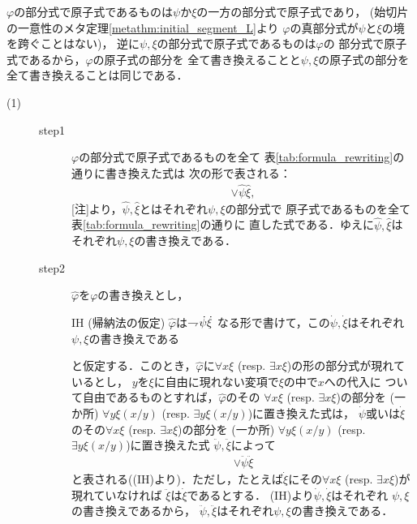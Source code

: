 	\begin{metaprf}
		[注] $\varphi$の部分式で原子式であるものは$\psi$か$\xi$の一方の部分式で原子式であり，
		(始切片の一意性のメタ定理\ref{metathm:initial_segment_L}より
		$\varphi$の真部分式が$\psi$と$\xi$の境を跨ぐことはない)，
		逆に$\psi,\xi$の部分式で原子式であるものは$\varphi$の
		部分式で原子式であるから，$\varphi$の原子式の部分を
		全て書き換えることと$\psi,\xi$の原子式の部分を全て書き換えることは同じである．
		\begin{description}
			\item[(1)] 
				\begin{description}
					\item[step1]
						$\varphi$の部分式で原子式であるものを全て
						表\ref{tab:formula_rewriting}の通りに書き換えた式は
						次の形で表される：
						\begin{align}
							\vee \hat{\psi} \hat{\xi},
						\end{align}
						[注]より，$\hat{\psi},\hat{\xi}$とはそれぞれ$\psi,\xi$の部分式で
						原子式であるものを全て表\ref{tab:formula_rewriting}の通りに
						直した式である．ゆえに$\hat{\psi},\hat{\xi}$は
						それぞれ$\psi,\xi$の書き換えである．
						
					\item[step2]
						$\widehat{\varphi}$を$\varphi$の書き換えとし，
						\begin{itembox}[l]{IH (帰納法の仮定)}
							$\widehat{\varphi}$は$\rightharpoondown\hspace{-0.25em} \dot{\psi} \dot{\xi}$
							なる形で書けて，この$\dot{\psi},\dot{\xi}$はそれぞれ
							$\psi,\xi$の書き換えである
						\end{itembox}
						と仮定する．このとき，$\widehat{\varphi}$に$\forall x \xi$ 
						(resp. $\exists x \xi$)の形の部分式が現れているとし，
						$y$を$\xi$に自由に現れない変項で$\xi$の中で$x$への代入に
						ついて自由であるものとすれば，$\widehat{\varphi}$のその
						$\forall x \xi$ (resp. $\exists x \xi$)の部分を
						(一か所) $\forall y \xi(x/y)$
						(resp. $\exists y \xi(x/y)$)に置き換えた式は，
						$\dot{\psi}$或いは$\dot{\xi}$のその$\forall x \xi$
						(resp. $\exists x \xi$)の部分を
						(一か所) $\forall y \xi(x/y)$
						(resp. $\exists y \xi(x/y)$)に置き換えた式
						$\ddot{\psi},\ddot{\xi}$によって
						\begin{align}
							\vee \ddot{\psi} \ddot{\xi}
						\end{align}
						と表される((IH)より)．ただし，たとえば$\dot{\xi}$にその$\forall x \xi$
						(resp. $\exists x \xi$)が現れていなければ
						$\ddot{\xi}$は$\dot{\xi}$であるとする．
						(IH)より$\dot{\psi},\dot{\xi}$はそれぞれ
						$\psi,\xi$の書き換えであるから，
						$\ddot{\psi},\ddot{\xi}$はそれぞれ$\psi,\xi$の書き換えである．
				\end{description}
				

\end{description}
\end{metaprf}
